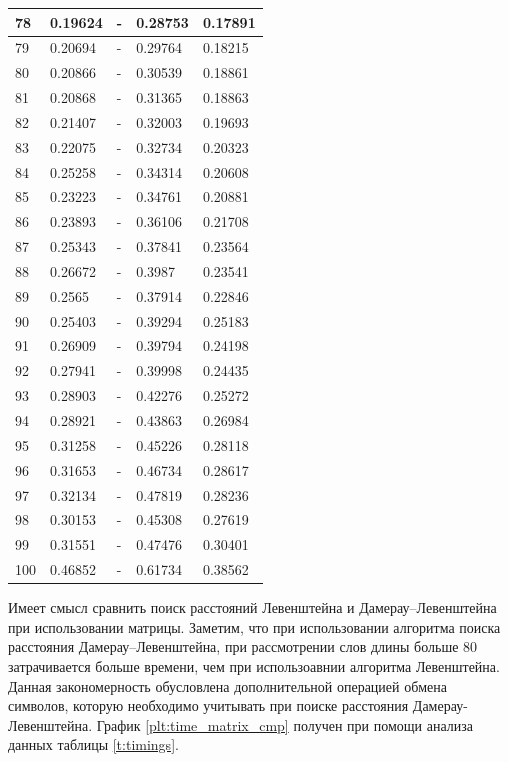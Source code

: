 \begin{table}[!ht]
\begin{tabular}{|l|l|l|l|l|}
        78 & 0.19624 & - & 0.28753 & 0.17891 \\ \hline
        79 & 0.20694 & - & 0.29764 & 0.18215 \\ \hline
        80 & 0.20866 & - & 0.30539 & 0.18861 \\ \hline
        81 & 0.20868 & - & 0.31365 & 0.18863 \\ \hline
        82 & 0.21407 & - & 0.32003 & 0.19693 \\ \hline
        83 & 0.22075 & - & 0.32734 & 0.20323 \\ \hline
        84 & 0.25258 & - & 0.34314 & 0.20608 \\ \hline
        85 & 0.23223 & - & 0.34761 & 0.20881 \\ \hline
        86 & 0.23893 & - & 0.36106 & 0.21708 \\ \hline
        87 & 0.25343 & - & 0.37841 & 0.23564 \\ \hline
        88 & 0.26672 & - & 0.3987 & 0.23541 \\ \hline
        89 & 0.2565 & - & 0.37914 & 0.22846 \\ \hline
        90 & 0.25403 & - & 0.39294 & 0.25183 \\ \hline
        91 & 0.26909 & - & 0.39794 & 0.24198 \\ \hline
        92 & 0.27941 & - & 0.39998 & 0.24435 \\ \hline
        93 & 0.28903 & - & 0.42276 & 0.25272 \\ \hline
        94 & 0.28921 & - & 0.43863 & 0.26984 \\ \hline
        95 & 0.31258 & - & 0.45226 & 0.28118 \\ \hline
        96 & 0.31653 & - & 0.46734 & 0.28617 \\ \hline
        97 & 0.32134 & - & 0.47819 & 0.28236 \\ \hline
        98 & 0.30153 & - & 0.45308 & 0.27619 \\ \hline
        99 & 0.31551 & - & 0.47476 & 0.30401 \\ \hline
        100 & 0.46852 & - & 0.61734 & 0.38562 \\ \hline
    \end{tabular}
\end{table}

Имеет смысл сравнить поиск расстояний Левенштейна и Дамерау--Левенштейна при использовании матрицы. Заметим, что при использовании
алгоритма поиска расстояния Дамерау--Левенштейна, при рассмотрении слов длины больше 80 затрачивается больше времени, чем 
при использоавнии алгоритма Левенштейна. Данная закономерность обусловлена дополнительной операцией обмена символов, которую 
необходимо учитывать при поиске расстояния Дамерау-Левенштейна. График \ref{plt:time_matrix_cmp} получен при 
помощи анализа данных таблицы \ref{t:timings}.

